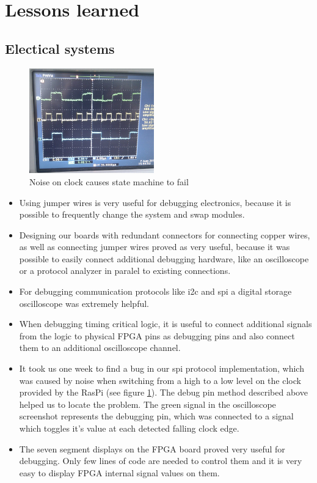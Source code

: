 \documentclass[a4paper
               ,10pt
               ,DIV=10 %
               ,BCOR=0.3cm
               ,pagesize %
               ,headings=small
               ,bibtotoc
               ]
               {scrartcl}
\begin{document}
\section{Lessons learned}
\subsection{Electical systems}
\begin{figure}
\includegraphics[width=0.48\textwidth]{pic/spi.png}
\caption{Noise on clock causes state machine to fail}
\label{fignoise}
\end{figure}
\begin{itemize}
  \item Using jumper wires is very useful for debugging electronics, because it is possible to frequently change the system and swap modules.
  \item Designing our boards with redundant connectors for connecting copper wires, as well as connecting jumper wires proved as very useful, because it was possible to easily connect additional debugging hardware, like an oscilloscope or a protocol analyzer in paralel to existing connections.
  \item For debugging communication protocols like i2c and spi a digital storage oscilloscope was extremely helpful.
  \item When debugging timing critical logic, it is useful to connect additional signals from the logic to physical FPGA pins as debugging pins and also connect them to an additional oscilloscope channel.
  \item It took us one week to find a bug in our spi protocol implementation, which was caused by noise when switching from a high to a low level on the clock provided by the RasPi (see figure \ref{fignoise}). The debug pin method described above helped us to locate the problem. The green signal in the oscilloscope screenshot represents the debugging pin, which was connected to a signal which toggles it's value at each detected falling clock edge.

	\item The seven segment displays on the FPGA board proved very useful for debugging. Only few lines of code are needed to control them and it is very easy to display FPGA internal signal values on them.
\end{itemize}
\end{document}
